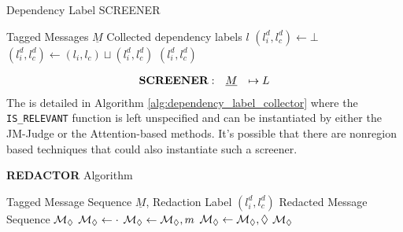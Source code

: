 \begin{algorithm}
\caption{Dependency Label SCREENER}
\label{alg:dependency_label_collector}
\begin{algorithmic}[1]
\Require Tagged Messages $\underline{M}$
\Ensure Collected dependency labels $l$
\State $(l_i^d, l_c^d) \gets \bot$ 
        \State $(l_i^d, l_c^d) \gets (l_i, l_c) \sqcup (l_i^d, l_c^d)$ 
    \EndIf
\EndFor
\State \Return $(l_i^d, l_c^d)$ 
\end{algorithmic}
\end{algorithm}
\vspace{-1em}
{
\setlength{\abovedisplayskip}{0pt}
\setlength{\belowdisplayskip}{2pt}
\begin{equation*}
\begin{array}{l@{\;}rcl}
\textbf{SCREENER} & : & \underline{M} &  \mapsto L
\end{array}
\end{equation*}
}
The \dependencydetector is detailed in Algorithm \ref{alg:dependency_label_collector} where the \texttt{IS\_RELEVANT} function is left unspecified and can be instantiated by either the JM-Judge or the Attention-based methods. It's possible that there are nonregion based techniques that could also instantiate such a screener.

\begin{algorithm}[H]
\caption{\textbf{REDACTOR} Algorithm}
\label{alg:redaction}
\begin{algorithmic}[1]
\Require Tagged Message Sequence $\underline{M}$, Redaction Label $(l_i^d, l_c^d)$
\Ensure Redacted Message Sequence $\mathcal{M}_{\lozenge}$
\State $\mathcal{M}_{\lozenge} \gets \cdot$ 
     
        \State $\mathcal{M}_{\lozenge} \gets \mathcal{M}_{\lozenge}, m$ 
    \Else
        \State $\mathcal{M}_{\lozenge} \gets  \mathcal{M}_{\lozenge},\lozenge $ 
    \EndIf
\EndFor
\State \Return $\mathcal{M}_{\lozenge} $ 
\end{algorithmic}
\end{algorithm}


